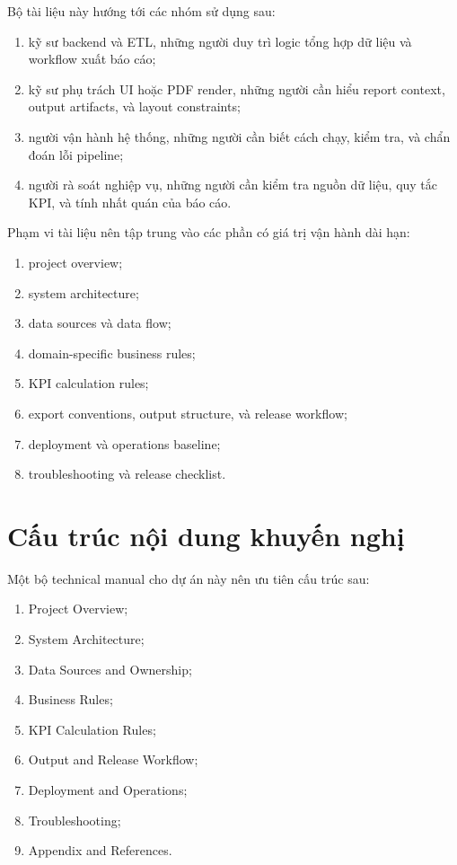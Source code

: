 Bộ tài liệu này hướng tới các nhóm sử dụng sau:

\begin{enumerate}[label=-]
\item kỹ sư backend và ETL, những người duy trì logic tổng hợp dữ liệu và workflow xuất báo cáo;
\item kỹ sư phụ trách UI hoặc PDF render, những người cần hiểu report context, output artifacts, và layout constraints;
\item người vận hành hệ thống, những người cần biết cách chạy, kiểm tra, và chẩn đoán lỗi pipeline;
\item người rà soát nghiệp vụ, những người cần kiểm tra nguồn dữ liệu, quy tắc KPI, và tính nhất quán của báo cáo.
\end{enumerate}

Phạm vi tài liệu nên tập trung vào các phần có giá trị vận hành dài hạn:

\begin{enumerate}[label=-]
\item project overview;
\item system architecture;
\item data sources và data flow;
\item domain-specific business rules;
\item KPI calculation rules;
\item export conventions, output structure, và release workflow;
\item deployment và operations baseline;
\item troubleshooting và release checklist.
\end{enumerate}

\section{Cấu trúc nội dung khuyến nghị}

Một bộ technical manual cho dự án này nên ưu tiên cấu trúc sau:

\begin{enumerate}
\item Project Overview;
\item System Architecture;
\item Data Sources and Ownership;
\item Business Rules;
\item KPI Calculation Rules;
\item Output and Release Workflow;
\item Deployment and Operations;
\item Troubleshooting;
\item Appendix and References.
\end{enumerate}

